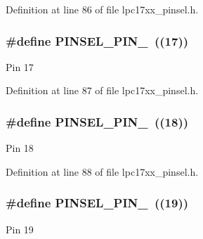 Definition at line 86 of file lpc17xx\+\_\+pinsel.\+h.

\subsubsection[{\texorpdfstring{P\+I\+N\+S\+E\+L\+\_\+\+P\+I\+N\+\_\+17}{PINSEL_PIN_17}}]{\setlength{\rightskip}{0pt plus 5cm}\#define P\+I\+N\+S\+E\+L\+\_\+\+P\+I\+N\+\_~((17))}\hypertarget{group___p_i_n_s_e_l___public___macros_ga1b43687db040e5b4d7e4d6ba6cac0e83}{}\label{group___p_i_n_s_e_l___public___macros_ga1b43687db040e5b4d7e4d6ba6cac0e83}
Pin 17 

Definition at line 87 of file lpc17xx\+\_\+pinsel.\+h.

\subsubsection[{\texorpdfstring{P\+I\+N\+S\+E\+L\+\_\+\+P\+I\+N\+\_\+18}{PINSEL_PIN_18}}]{\setlength{\rightskip}{0pt plus 5cm}\#define P\+I\+N\+S\+E\+L\+\_\+\+P\+I\+N\+\_~((18))}\hypertarget{group___p_i_n_s_e_l___public___macros_ga6203e5b5f1e3a49fa2fc1ca61f6fde52}{}\label{group___p_i_n_s_e_l___public___macros_ga6203e5b5f1e3a49fa2fc1ca61f6fde52}
Pin 18 

Definition at line 88 of file lpc17xx\+\_\+pinsel.\+h.

\subsubsection[{\texorpdfstring{P\+I\+N\+S\+E\+L\+\_\+\+P\+I\+N\+\_\+19}{PINSEL_PIN_19}}]{\setlength{\rightskip}{0pt plus 5cm}\#define P\+I\+N\+S\+E\+L\+\_\+\+P\+I\+N\+\_~((19))}\hypertarget{group___p_i_n_s_e_l___public___macros_ga2b68a8639e7133664f1ebf2ef222eca0}{}\label{group___p_i_n_s_e_l___public___macros_ga2b68a8639e7133664f1ebf2ef222eca0}
Pin 19 

